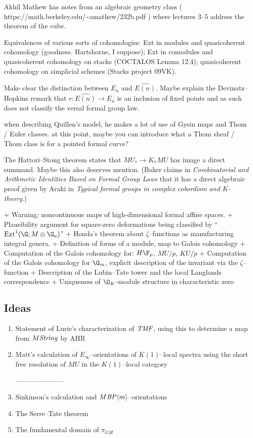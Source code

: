 \documentclass[12pt]{book}
\begin{document}
Akhil Mathew has notes from an algebraic geometry class ( https://math.berkeley.edu/{\textasciitilde}amathew/232b.pdf ) where lectures 3--5 address the theorem of the cube.

Equivalences of various sorts of cohomologies: Ext in modules and quasicoherent cohomology (goodness. Hartshorne, I suppose); Ext in comodules and quasicoherent cohomology on stacks (COCTALOS Lemma 12.4); quasicoherent cohomology on simplicial schemes (Stacks project 09VK).

Make clear the distinction between $E_n$ and $\widehat{E(n)}$. Maybe explain the Devinatz--Hopkins remark that $r: \widehat{E(n)} \to E_n$ is an inclusion of fixed points and as such does not classify the versal formal group law.


when describing Quillen's model, he makes a lot of use of Gysin maps and Thom / Euler classes. at this point, maybe you can introduce what a Thom sheaf / Thom class is for a pointed formal curve?








The Hattori--Stong theorem states that $MU_* \to K_* MU$ has image a direct summand.  Maybe this also deserves mention.  (Baker claims in \textit{Combinatorial and Arithmetic Identities Based on Formal Group Laws} that it has a direct algebraic proof given by Araki in \textit{Typical formal groups in complex cobordism and $K$-theory}.)








+ Warning: noncontinuous maps of high-dimensional formal affine spaces.
+ Plausibility argument for square-zero deformations being classified by ``$\Ext^1(\G; M \otimes \G_a)$''
+ Honda's theorem about $\zeta$--functions as manufacturing integral genera.
+ Definition of forms of a module, map to Galois cohomology
+ Computation of the Galois cohomology for: $H\F_p$, $MU/p$, $KU/p$
+ Computation of the Galois cohomology for $\G_m$, explicit description of the invariant via the $\zeta$--function
+ Description of the Lubin--Tate tower and the local Langlands correspondence
+ Uniqueness of $\O_K$-module structure in characteristic zero

\subsection*{Ideas}
\begin{enumerate}
\item Statement of Lurie's characterization of $\mathit{TMF}$, using this to determine a map from $M\mathit{String}$ by AHR
\item Matt's calculation of $E_\infty$--orientations of $K(1)$--local spectra using the short free resolution of $MU$ in the $K(1)$--local category

---------------------
\item Sinkinson's calculation and $M\mathit{BP}\langle m\rangle$--orientations
\item The Serre--Tate theorem
\item The fundamental domain of $\pi_{GH}$
\end{enumerate}
\end{document}
